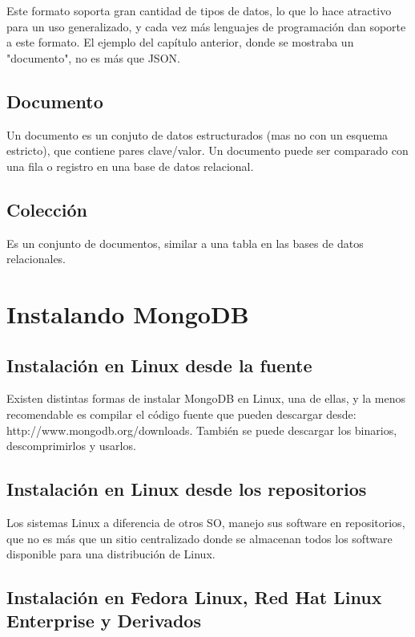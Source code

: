 Este formato soporta gran cantidad de tipos de datos, lo que lo hace atractivo para un uso generalizado, y cada vez m\'as lenguajes de programaci\'on dan soporte a este formato. El ejemplo del cap\'itulo anterior, donde se mostraba un "documento", no es m\'as que JSON.

\subsection{Documento}

Un documento es un conjuto de datos estructurados (mas no con un esquema estricto), que contiene pares clave/valor. Un documento puede ser comparado con una fila o registro en una base de datos relacional.

\subsection{Colecci\'on}

Es un conjunto de documentos, similar a una tabla en las bases de datos relacionales.

\section{Instalando MongoDB}

\subsection{Instalaci\'on en Linux desde la fuente}

Existen distintas formas de instalar MongoDB en Linux, una de ellas, y la menos recomendable es compilar el c\'odigo fuente que pueden descargar desde: http://www.mongodb.org/downloads. Tambi\'en se puede descargar los binarios, descomprimirlos y usarlos.

\subsection{Instalaci\'on en Linux desde los repositorios}

Los sistemas Linux a diferencia de otros SO, manejo sus software en repositorios, que no es m\'as que un sitio centralizado donde se almacenan todos los software disponible para una distribuci\'on de Linux.

\subsection*{Instalaci\'on en Fedora Linux, Red Hat Linux Enterprise y Derivados}

